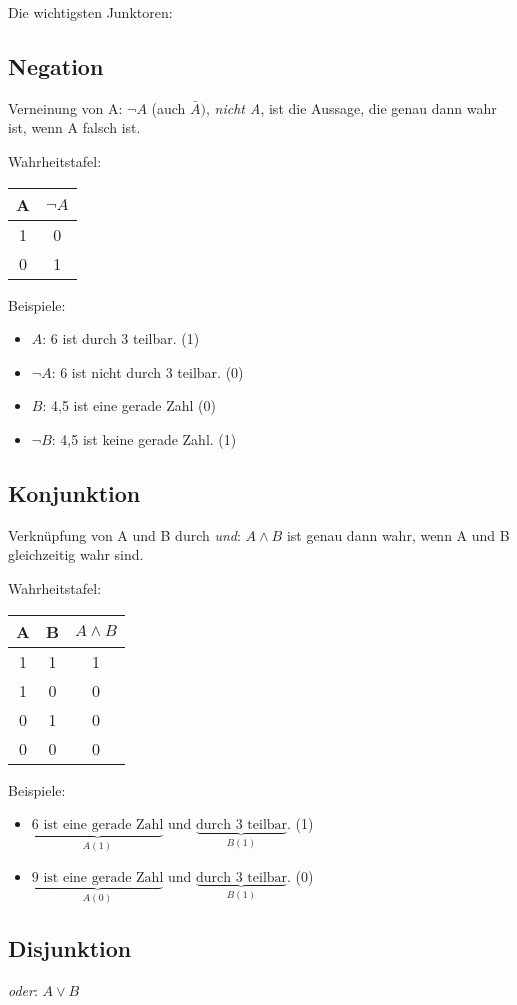 \documentclass[a4paper, 12pt, twoside] {article}
\begin{document}
Die wichtigsten Junktoren:

\subsection{Negation}
Verneinung von A: $\neg A$ (auch $\bar{A})$, \textit{nicht A}, ist die Aussage, die genau dann wahr ist, wenn A falsch ist.

Wahrheitstafel: \qquad
\begin{tabular}{| c | c |}
\hline
A & $\neg A$ \\
\hline
1 & 0 \\
0 & 1 \\
\hline
\end{tabular}

Beispiele: 
\begin{itemize}
\item $A$: 6 ist durch 3 teilbar. (1)
\item $\neg A $: 6 ist nicht durch 3 teilbar. (0)
\item $B$: 4,5 ist eine gerade Zahl (0)
\item $\neg B$: 4,5 ist keine gerade Zahl. (1)
\end{itemize}

\subsection{Konjunktion}
Verknüpfung von A und B durch \textit{und}: $A \wedge B$ ist genau dann wahr, wenn A und B gleichzeitig wahr sind.

Wahrheitstafel: \qquad
\begin{tabular}{| c c | c |}
\hline
A & B & $A \wedge B$ \\
\hline
1 & 1 & 1 \\
1 & 0 & 0 \\
0 & 1 & 0 \\
0 & 0 & 0 \\
\hline
\end{tabular}

Beispiele:
\begin{itemize}
\item $\underbrace{\text{6 ist eine gerade Zahl}}_{A (1)}$ und $\underbrace{\text{durch 3 teilbar}}_{B (1)}$. (1)
\item $\underbrace{\text{9 ist eine gerade Zahl}}_{A (0)}$ und $\underbrace{\text{durch 3 teilbar}}_{B (1)}$. (0)
\end{itemize}

\subsection{Disjunktion}
\textit{oder}: $A \lor B$
\end{document}
